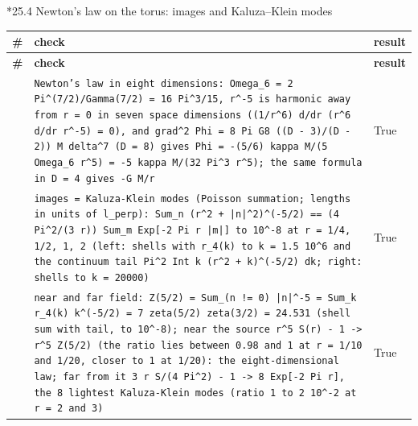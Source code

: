 \documentclass[10pt,a4paper]{article}
\makeatletter
\renewcommand\subsubsection{\@startsection{subsubsection}{3}{\z@}{-3.25ex\@plus -1ex \@minus -.2ex}{1.5ex \@plus .2ex}{\normalfont\normalsize\bfseries\raggedright}}
\makeatother
\begin{document}
\subsubsection*{25.4 Newton’s law on the torus: images and Kaluza–Klein modes}
{\footnotesize
\begin{longtable}{>{\raggedright\arraybackslash}p{}>{\raggedright\arraybackslash}p{}>{\raggedright\arraybackslash}p{}}
\toprule
\textbf{\#} & \textbf{check} & \textbf{result} \\
\midrule\endfirsthead
\toprule
\textbf{\#} & \textbf{check} & \textbf{result} \\
\midrule\endhead
\endfoot
\bottomrule\endlastfoot
430 & \texttt{Newton's law in eight dimensions: Omega\_\allowbreak{}6 = 2 Pi\textasciicircum{}(7/\allowbreak{}2)/\allowbreak{}Gamma(7/\allowbreak{}2) = 16 Pi\textasciicircum{}3/\allowbreak{}15, r\textasciicircum{}-5 is harmonic away from r = 0 in seven space dimensions ((1/\allowbreak{}r\textasciicircum{}6) d/\allowbreak{}dr (r\textasciicircum{}6 d/\allowbreak{}dr r\textasciicircum{}-5) = 0), and grad\textasciicircum{}2 Phi = 8 Pi G8 ((D - 3)/\allowbreak{}(D - 2)) M delta\textasciicircum{}7 (D = 8) gives Phi = -(5/\allowbreak{}6) kappa M/\allowbreak{}(5 Omega\_\allowbreak{}6 r\textasciicircum{}5) = -5 kappa M/\allowbreak{}(32 Pi\textasciicircum{}3 r\textasciicircum{}5); the same formula in D = 4 gives -G M/\allowbreak{}r} & True \\
431 & \texttt{images = Kaluza-Klein modes (Poisson summation; lengths in units of l\_\allowbreak{}perp): Sum\_\allowbreak{}n (r\textasciicircum{}2 + |n|\textasciicircum{}2)\textasciicircum{}(-5/\allowbreak{}2) == (4 Pi\textasciicircum{}2/\allowbreak{}(3 r)) Sum\_\allowbreak{}m Exp[-2 Pi r |m|] to 10\textasciicircum{}-8 at r = 1/\allowbreak{}4, 1/\allowbreak{}2, 1, 2 (left: shells with r\_\allowbreak{}4(k) to k = 1.5 10\textasciicircum{}6 and the continuum tail Pi\textasciicircum{}2 Int k (r\textasciicircum{}2 + k)\textasciicircum{}(-5/\allowbreak{}2) dk; right: shells to k = 20000)} & True \\
432 & \texttt{near and far field: Z(5/\allowbreak{}2) = Sum\_\allowbreak{}(n != 0) |n|\textasciicircum{}-5 = Sum\_\allowbreak{}k r\_\allowbreak{}4(k) k\textasciicircum{}(-5/\allowbreak{}2) = 7 zeta(5/\allowbreak{}2) zeta(3/\allowbreak{}2) = 24.531 (shell sum with tail, to 10\textasciicircum{}-8); near the source r\textasciicircum{}5 S(r) - 1 -> r\textasciicircum{}5 Z(5/\allowbreak{}2) (the ratio lies between 0.98 and 1 at r = 1/\allowbreak{}10 and 1/\allowbreak{}20, closer to 1 at 1/\allowbreak{}20): the eight-dimensional law; far from it 3 r S/\allowbreak{}(4 Pi\textasciicircum{}2) - 1 -> 8 Exp[-2 Pi r], the 8 lightest Kaluza-Klein modes (ratio 1 to 2 10\textasciicircum{}-2 at r = 2 and 3)} & True \\

\end{longtable}}
\end{document}
